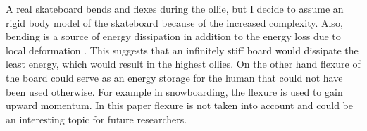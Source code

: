 A real skateboard bends and flexes during the ollie, but I decide to assume an rigid body model of the skateboard because of the increased complexity. Also, bending is a source of energy dissipation in addition to the energy loss due to local deformation \cite{stronge_impact_2000}. This suggests that an infinitely stiff board would dissipate the least energy, which would result in the highest ollies. On the other hand flexure of the board could serve as an energy storage for the human that could not have been used otherwise. For example in snowboarding, the flexure is used to gain upward momentum. In this paper flexure is not taken into account and could be an interesting topic for future researchers.


